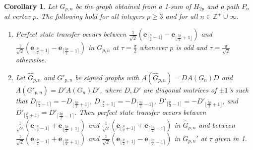 \documentclass[12pt,a4paper]{article}
\newtheorem{cor}{Corollary}
\def \e {{\bf e}}
\def \e {{\mathbf e}}
\begin{document}
\begin{cor}
Let $G_{p,n}$ be the graph obtained from a 1-sum of $H_{2p}$ and a path $P_{n}$ at vertex $p$. The following hold for all integers $p\geq 3$ and for all $n\in\mathbb{Z}^+\cup{\infty}$.
\begin{enumerate}
\item Perfect state transfer occurs between $\frac{1}{\sqrt{2}}(\e_{\lceil\frac{p}{2}-1\rceil}-\e_{\lfloor\frac{3p}{2}+1\rfloor})$ and $\frac{1}{\sqrt{2}}(\e_{\lfloor\frac{p}{2}+1\rfloor}-\e_{\lceil\frac{3p}{2}-1\rceil})$ in $G_{p,n}$ at $\tau=\frac{\pi}{2}$ whenever $p$ is odd and $\tau=\frac{\pi}{\sqrt{2}}$ otherwise.
\item Let $\hat{G}_{p,n}$ and $G'_{p,n}$ be signed graphs with $A(\hat{G}_{p,n})=DA(G_n)D$ and $A(G'_{p,n})=D'A(G_n)D'$, where $D,D'$ are diagonal matrices of $\pm 1$'s such that $D_{\lceil\frac{p}{2}-1\rceil}=-D_{\lfloor\frac{3p}{2}+1\rfloor}$, $D_{\lfloor\frac{p}{2}+1\rfloor}=-D_{\lceil\frac{3p}{2}-1\rceil}$,  $D'_{\lceil\frac{p}{2}-1\rceil}=-D'_{\lfloor\frac{3p}{2}+1\rfloor}$, and $D'_{\lfloor\frac{p}{2}+1\rfloor}=D'_{\lceil\frac{3p}{2}-1\rceil}$. Then perfect state transfer occurs between $\frac{1}{\sqrt{2}}(\e_{\lceil\frac{p}{2}-1\rceil}+\e_{\lfloor\frac{3p}{2}+1\rfloor})$ and $\frac{1}{\sqrt{2}}(\e_{\lfloor\frac{p}{2}+1\rfloor}+\e_{\lceil\frac{3p}{2}-1\rceil})$ in $\hat{G}_{p,n}$ and between $\frac{1}{\sqrt{2}}(\e_{\lceil\frac{p}{2}-1\rceil}+\e_{\lfloor\frac{3p}{2}+1\rfloor})$ and $\frac{1}{\sqrt{2}}(\e_{\lfloor\frac{p}{2}+1\rfloor}-\e_{\lceil\frac{3p}{2}-1\rceil})$ in $G_{p,n}'$ at $\tau$ given in 1.
\end{enumerate}
\end{cor}
\end{document}
